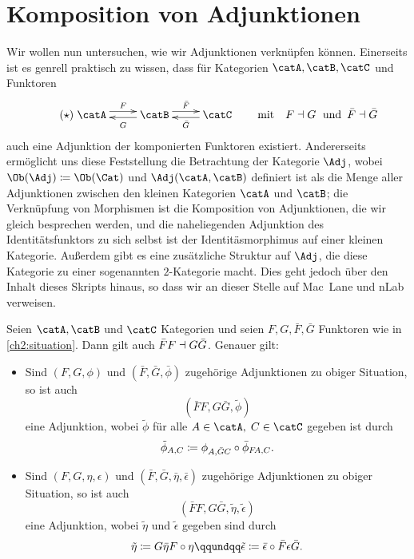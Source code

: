 \chapter{Komposition von Adjunktionen}
Wir wollen nun untersuchen, wie wir Adjunktionen verknüpfen können. Einerseits
ist es genrell praktisch zu wissen, dass für Kategorien $\catA,\catB,\catC$ und
Funktoren
\vspace{-1mm}
\[ \tag{$\star$} \label{ch2:situation}
    \xymatrix{ \catA \ar@<3.5pt>[r]^F & \ar@<2pt>[l]^{G\vphantom{\bar G}} \catB 
    \ar@<3.5pt>[r]^{\bar F} & \ar@<2pt>[l]^{\bar G} \catC
    }
    \qquad\text{mit}\quad 
    F\leftadjoint G \text{\; und \,} \bar F\leftadjoint\bar G
\]
auch eine Adjunktion der komponierten Funktoren existiert. Andererseits
ermöglicht uns diese Feststellung die Betrachtung der Kategorie $\Adj$, wobei
$\Ob(\Adj)\defeq\Ob(\Cat)$ und $\Adj(\catA,\catB)$ definiert ist als die 
Menge aller Adjunktionen %
zwischen den kleinen Kategorien $\catA$ und $\catB$;
die Verknüpfung von Morphismen ist die Komposition von Adjunktionen, die wir 
gleich besprechen werden, und die naheliegenden Adjunktion des
Identitätsfunktors zu sich selbst ist der Identitäsmorphimus auf einer kleinen
Kategorie. Außerdem gibt es eine zusätzliche Struktur auf $\Adj$, die diese
Kategorie zu einer sogenannten $2$-Kategorie macht. Dies geht jedoch über den
Inhalt dieses Skripts hinaus, so dass wir an dieser Stelle auf 
Mac~Lane\cite[\S\,IV.8,\;\S\,XII.3]{bookc:maclane97} und 
nLab\cite{www:nlab:2category} verweisen.

\begin{thProposition}
    Seien $\catA,\catB$ und $\catC$ Kategorien und seien $F,G,\bar F,\bar G$
    Funktoren wie in \eqref{ch2:situation}.
    Dann gilt auch $\bar F F \dashv G\bar G$.
    Genauer gilt:
    \begin{itemize}
        \item
            Sind $(F,G,\phi)$ und $(\bar F,\bar G,\bar\phi)$ zugehörige
            Adjunktionen zu obiger Situation, so ist auch
            \[ (\bar F F, G\bar G, \tilde\phi) \]  
            eine Adjunktion, wobei $\tilde\phi$ für alle 
            $A\in\catA,\; C\in\catC$ gegeben ist durch
            \[ \tilde\phi_{A,C} \defeq 
                \phi_{A,\bar GC} \after \bar\phi_{F\!A,C}
            . \]

        \item
            Sind $(F,G,\eta,\epsilon)$ und $(\bar F, \bar G, \bar\eta,
            \bar\epsilon)$ zugehörige Adjunktionen zu obiger Situation, so ist
            auch
            \[ (\bar F F, G\bar G, \tilde\eta, \tilde\epsilon) \]
            eine Adjunktion, wobei $\tilde\eta$ und $\tilde\epsilon$ gegeben
            sind durch
            \[ \tilde\eta \defeq G\bar\eta F \after \eta
                \qqundqq
                \tilde\epsilon \defeq \bar\epsilon \after \bar F\epsilon \bar G
            . \]
    \end{itemize}
\end{thProposition}

